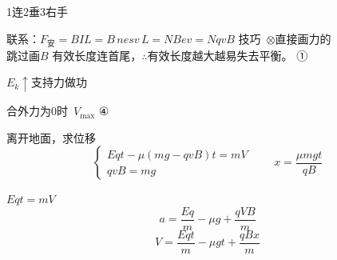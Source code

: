 1连\quad 2垂\quad 3右手

联系：$F_{\text{安}}=BIL=B\,nesv\,L=NBev=NqvB$
技巧\ $\otimes$\qquad 直接画力的\\
跳过画$B$
有效长度连首尾，$\therefore$有效长度越大越易失去平衡。
①

$E_{k}\uparrow$\quad 支持力做功

合外力为0时\ $V_{\max}$
④

离开地面，求位移
\[ \begin{cases} Eqt-\mu(mg-qvB)t=mV\\[2pt] qvB=mg \end{cases} \qquad x=\frac{\mu mgt}{qB} \]

$Eqt=mV$
\[ a=\frac{Eq}{m}-\mu g+\frac{qVB}{m} \]
\[ V=\frac{Eqt}{m}-\mu gt+\frac{qBx}{m} \]

